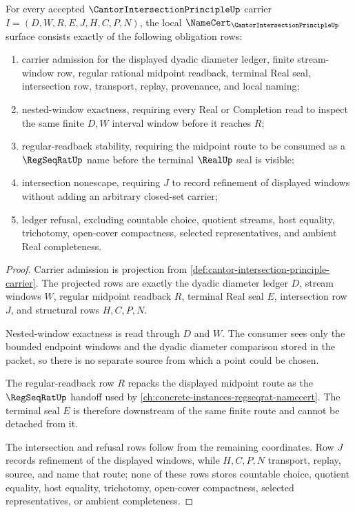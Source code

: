 \begin{theorem}
\label{thm:cantor-intersection-principle-namecert-obligations}
For every accepted $\CantorIntersectionPrincipleUp$ carrier $I=(D,W,R,E,J,H,C,P,N)$, the local $\NameCert_{\CantorIntersectionPrincipleUp}$ surface consists exactly of the following obligation rows:
\begin{enumerate}
\item carrier admission for the displayed dyadic diameter ledger, finite stream-window row, regular rational midpoint readback, terminal Real seal, intersection row, transport, replay, provenance, and local naming;
\item nested-window exactness, requiring every Real or Completion read to inspect the same finite $D,W$ interval window before it reaches $R$;
\item regular-readback stability, requiring the midpoint route to be consumed as a $\RegSeqRatUp$ name before the terminal $\RealUp$ seal is visible;
\item intersection nonescape, requiring $J$ to record refinement of displayed windows without adding an arbitrary closed-set carrier;
\item ledger refusal, excluding countable choice, quotient streams, host equality, trichotomy, open-cover compactness, selected representatives, and ambient Real completeness.
\end{enumerate}
\end{theorem}
\begin{proof}
Carrier admission is projection from \autoref{def:cantor-intersection-principle-carrier}. The projected rows are exactly the dyadic diameter ledger $D$, stream windows $W$, regular midpoint readback $R$, terminal Real seal $E$, intersection row $J$, and structural rows $H,C,P,N$.

Nested-window exactness is read through $D$ and $W$. The consumer sees only the bounded endpoint windows and the dyadic diameter comparison stored in the packet, so there is no separate source from which a point could be chosen.

The regular-readback row $R$ repacks the displayed midpoint route as the $\RegSeqRatUp$ handoff used by \autoref{ch:concrete-instances-regseqrat-namecert}. The terminal seal $E$ is therefore downstream of the same finite route and cannot be detached from it.

The intersection and refusal rows follow from the remaining coordinates. Row $J$ records refinement of the displayed windows, while $H,C,P,N$ transport, replay, source, and name that route; none of these rows stores countable choice, quotient equality, host equality, trichotomy, open-cover compactness, selected representatives, or ambient completeness.
\end{proof}

